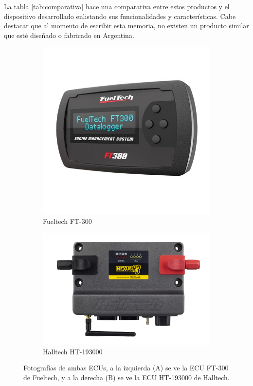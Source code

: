 La tabla \ref{tab:comparativa} hace una comparativa entre estos productos y el dispositivo desarrollado enlistando sus funcionalidades y características. Cabe destacar que al momento de escribir esta memoria, no existen un producto similar que esté diseñado o fabricado en Argentina.

\begin{figure}
\centering
\begin{subfigure}{.4\textwidth}
\centering
\includegraphics[width=\textwidth]{./Figures/fueltech-ft300.jpg}
\caption{Fueltech FT-300 \footnotemark[1]}
\label{fig:fueltech}
\end{subfigure}
\hfill
\begin{subfigure}{.5\textwidth}
\centering
\includegraphics[width=\textwidth]{./Figures/HT-193000_00.JPG}
\caption{Halltech HT-193000 \footnotemark[2]}
\label{fig:halltech}
\end{subfigure}
\hfill
\caption{Fotografías de ambas ECUs, a la izquierda (A) se ve la ECU FT-300 de Fueltech, y a la derecha (B) se ve la ECU HT-193000 de Halltech.}
\label{fig:comparativa}
\end{figure}

